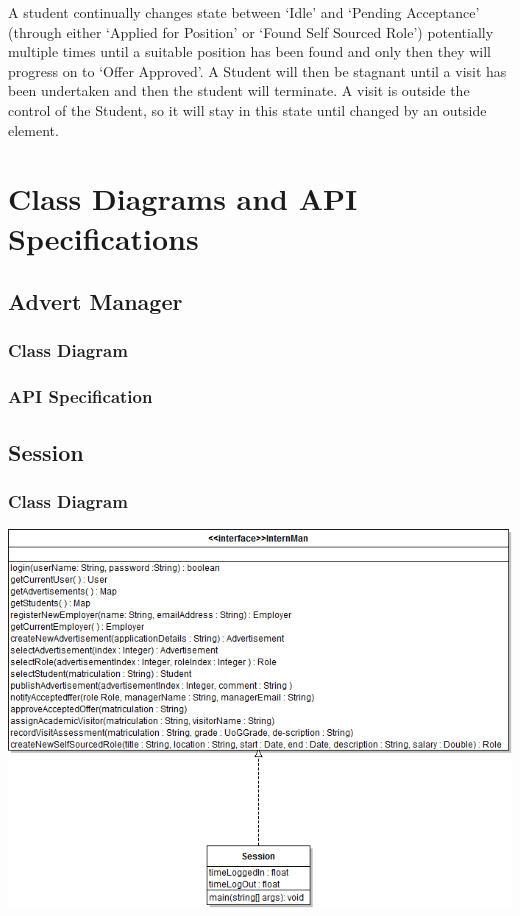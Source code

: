 \documentclass[11pt]{article}
\begin{document}
A student continually changes state between `Idle' and `Pending
Acceptance' (through either `Applied for Position' or `Found Self
Sourced Role') potentially multiple times until a suitable position
has been found and only then they will progress on to `Offer
Approved'. A Student will then be stagnant until a visit has been
undertaken and then the student will terminate. A visit is outside the
control of the Student, so it will stay in this state until changed by
an outside element.

\newpage

\section{Class Diagrams and API Specifications}

\subsection{Advert Manager}

\subsubsection{Class Diagram}

\subsubsection{API Specification}

\newpage

\subsection{Session}

\subsubsection{Class Diagram}

\includegraphics[scale=0.65,angle=90]{SessionClassDiagram.png}
\end{document}
